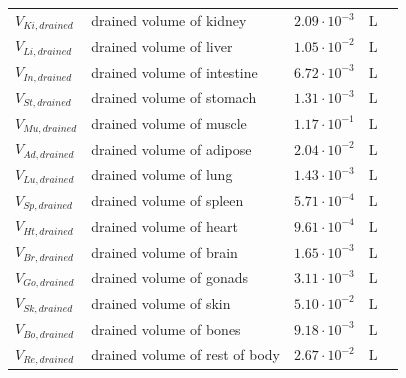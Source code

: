 \documentclass[preprint,12pt,authoryear]{elsarticle}
\begin{document}
\begin{longtable}{P{2cm}P{3.5cm}P{2cm}P{1cm}P{2.5cm}}
$V_{Ki,drained}$ & drained volume of kidney & $2.09 \cdot 10^{-3}$ & $\text{L}$ & \citep{brown_1997} \\
$V_{Li,drained}$ & drained volume of liver & $1.05 \cdot 10^{-2}$ & $\text{L}$ & \citep{brown_1997} \\
$V_{In,drained}$ & drained volume of intestine & $6.72 \cdot 10^{-3}$ & $\text{L}$ & \citep{brown_1997} \\
$V_{St,drained}$ & drained volume of stomach & $1.31 \cdot 10^{-3}$ & $\text{L}$ & \citep{brown_1997} \\
$V_{Mu,drained}$ & drained volume of muscle & $1.17 \cdot 10^{-1}$ & $\text{L}$ & \citep{brown_1997} \\
$V_{Ad,drained}$ & drained volume of adipose & $2.04 \cdot 10^{-2}$ & $\text{L}$ & \citep{brown_1997} \\
$V_{Lu,drained}$ & drained volume of lung & $1.43 \cdot 10^{-3}$ & $\text{L}$ & \citep{brown_1997} \\
$V_{Sp,drained}$ & drained volume of spleen & $5.71 \cdot 10^{-4}$ & $\text{L}$ & \citep{brown_1997} \\
$V_{Ht,drained}$ & drained volume of heart & $9.61 \cdot 10^{-4}$ & $\text{L}$ & \citep{brown_1997} \\
$V_{Br,drained}$ & drained volume of brain & $1.65 \cdot 10^{-3}$ & $\text{L}$ & \citep{brown_1997} \\
$V_{Go,drained}$ & drained volume of gonads & $3.11 \cdot 10^{-3}$ & $\text{L}$ & \citep{willmann_2003} \\
$V_{Sk,drained}$ & drained volume of skin & $5.10 \cdot 10^{-2}$ & $\text{L}$ & \citep{brown_1997} \\
$V_{Bo,drained}$ & drained volume of bones & $9.18 \cdot 10^{-3}$ & $\text{L}$ & \citep{brown_1997} \\
$V_{Re,drained}$ & drained volume of rest of body & $2.67 \cdot 10^{-2}$ & $\text{L}$ & \citep{brown_1997} \\
\midrule\midrule


\end{longtable}
\end{document}
